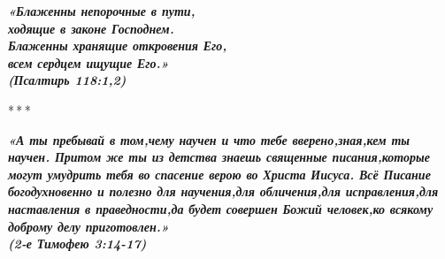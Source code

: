 \documentclass[fontsize=12pt,letterpaper,DIV=6]{scrartcl}
\begin{document}
\clearpage
\thispagestyle{empty}
{\centering\huge\itshape\bfseries «Блаженны непорочные в пути,\\ ходящие в законе Господнем.\\
Блаженны хранящие откровения Его,\\ всем сердцем ищущие Его.»\\
(Псалтирь 118:1,2)
\par}
\centerline{*\,*\,*}
{\centering\huge\itshape\bfseries «А ты пребывай в том,чему научен и что тебе вверено,зная,кем ты научен.
Притом же ты из детства знаешь священные писания,которые могут умудрить тебя во спасение верою во Христа Иисуса. 
Всё Писание богодухновенно и полезно для научения,для обличения,для исправления,для наставления в праведности,да будет совершен Божий человек,ко всякому доброму делу приготовлен.»\\

(2-е Тимофею 3:14-17)\par}
\end{document}
